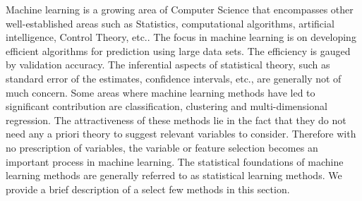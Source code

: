 Machine learning is a growing area of Computer Science that encompasses other well-established areas such as Statistics, computational algorithms, artificial intelligence, Control Theory, etc.. The focus in machine learning is on developing efficient algorithms for prediction using large data sets. The efficiency is gauged by validation accuracy. The inferential aspects of statistical theory, such as standard error of the estimates, confidence intervals, etc., are generally not of much concern. Some areas where machine learning methods have led to significant contribution are classification, clustering and multi-dimensional regression. The attractiveness of these methods lie in the fact that they do not need any a priori theory to suggest relevant variables to consider. Therefore with no prescription of variables, the variable or feature selection becomes an important process in machine learning. The statistical foundations of machine learning methods are generally referred to as statistical learning methods. We provide a brief description of a select few methods in this section. \\

